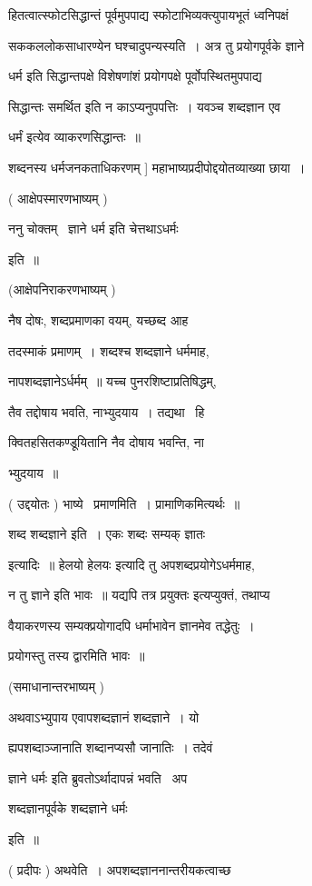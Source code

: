 \documentclass[11pt, openany]{book}
\begin{document}
हितत्वात्स्फोटसिद्धान्तं पूर्वमुपपाद्य स्फोटाभिव्यक्त्युपायभूतं
ध्वनिपक्षं 

सककललोकसाधारण्येन घश्चादुपन्यस्यति~। अत्र तु प्रयोगपूर्वके ज्ञाने 

धर्म इति सिद्धान्तपक्षे विशेषणांशं प्रयोगपक्षे पूर्वोपस्थितमुपपाद्य 

सिद्धान्तः समर्थित इति न काऽप्यनुपपत्तिः~। यवञ्च शब्दज्ञान एव 

धर्मं इत्येव व्याकरणसिद्धान्तः~॥ 

शब्दनस्य धर्मजनकताधिकरणम् ] महाभाष्यप्रदीपोद्दयोतव्याख्या छाया~। 



( आक्षेपस्मारणभाष्यम् ) 

ननु चोक्तम् \textendash\ ज्ञाने धर्म इति चेत्तथाऽधर्मः

इति~॥ 

(आक्षेपनिराकरणभाष्यम् ) 

नैष दोषः, शब्दप्रमाणका वयम्, यच्छब्द आह 

तदस्माकं प्रमाणम्~। शब्दश्च शब्दज्ञाने धर्ममाह, 

नापशब्दज्ञानेऽर्धर्मम्~॥ यच्च पुनरशिष्टाप्रतिषिद्धम्, 

तैव तद्दोषाय भवति, नाभ्युदयाय~। तद्यथा \textendash\ हि \textendash\ 

क्वितहसितकण्डूयितानि नैव दोषाय भवन्ति, ना \textendash\ 

भ्युदयाय~॥ 

( उद्दयोतः ) भाष्ये \textendash\ प्रमाणमिति~। प्रामाणिकमित्यर्थः~॥ 

शब्द शब्दज्ञाने इति~। {\qt एकः शब्दः सम्यक् ज्ञातः} 

इत्यादिः~॥ {\qt हेलयो हेलयः} इत्यादि तु अपशब्दप्रयोगेऽधर्ममाह, 

न तु ज्ञाने इति भावः~॥ यद्यपि तत्र {\qt प्रयुक्तः} इत्यप्युक्तं, तथाप्य \textendash\ 

वैयाकरणस्य सम्यक्प्रयोगादपि धर्माभावेन ज्ञानमेव तद्धेतुः~। 

प्रयोगस्तु तस्य द्वारमिति भावः~॥ 

(समाधानान्तरभाष्यम् ) 

अथवाऽभ्युपाय एवापशब्दज्ञानं शब्दज्ञाने~। यो 

ह्यपशब्दाञ्जानाति शब्दानप्यसौ जानातिः~। तदेवं 

{\qt ज्ञाने धर्मः इति ब्रुवतोऽर्थादापन्नं भवति \textendash\ अप \textendash\ 

शब्दज्ञानपूर्वके शब्दज्ञाने धर्मः} इति~॥ 

( प्रदीपः ) अथवेति~। अपशब्दज्ञाननान्तरीयकत्वाच्छ \textendash\ 
\end{document}
